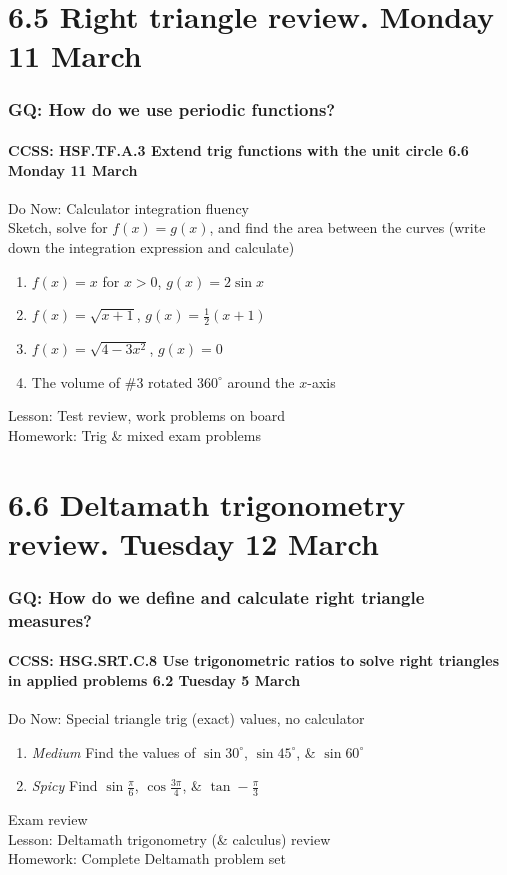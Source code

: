 \documentclass{beamer}
\begin{document}
\section{6.5 Right triangle review. Monday 11 March}
  \frame
  {
    \frametitle{GQ: How do we use periodic functions?}
    \framesubtitle{CCSS: HSF.TF.A.3 Extend trig functions with the unit circle  \hfill \alert{6.6 Monday 11 March}}

    \begin{block}{Do Now: Calculator integration fluency\\
      Sketch, solve for $f(x)=g(x)$, and find the area between the curves (write down the integration expression and calculate)}
      \begin{enumerate}
        \item $f(x)=x$ for $x>0$, $g(x)=2 \sin x$
        \item $f(x)=\sqrt{x+1}$, $g(x)=\frac{1}{2}(x+1)$
        \item $f(x)=\sqrt{4-3x^2}$, $g(x)=0$
        \item The volume of \#3 rotated $360^\circ$ around the $x$-axis
      \end{enumerate}
      \end{block}
    Lesson: Test review, work problems on board\\%
    Homework: Trig \& mixed exam problems
  }

\section{6.6 Deltamath trigonometry review. Tuesday 12 March}
  \frame
  {
    \frametitle{GQ: How do we define and calculate right triangle measures?}
    \framesubtitle{CCSS: HSG.SRT.C.8 Use trigonometric ratios to solve right triangles in applied problems \hfill \alert{6.2 Tuesday 5 March}}

      \begin{block}{Do Now: Special triangle trig (exact) values, no calculator}
      \begin{enumerate}
          \item \emph{Medium} Find the values of $\sin 30^\circ$, $\sin 45^\circ$, \& $\sin 60^\circ$
          \item \emph{Spicy} Find $\sin \frac{\pi}{6}$, $\cos \frac{3\pi}{4}$, \& $\tan -\frac{\pi}{3}$
      \end{enumerate}
      \end{block}
    Exam review\\
    Lesson: Deltamath trigonometry (\& calculus) review\\
    Homework: Complete Deltamath problem set
  }
\end{document}
